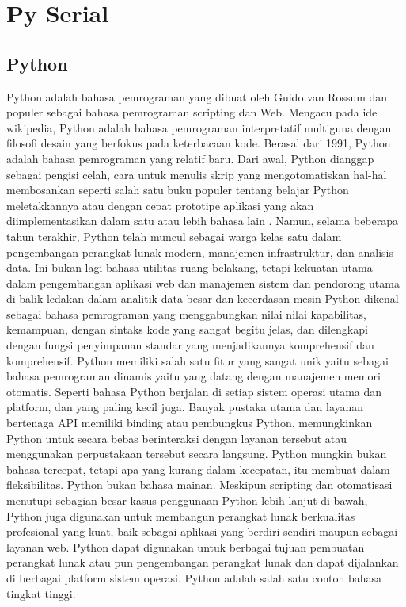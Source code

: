 \section{Py Serial}

	\subsection{Python}
	Python adalah bahasa pemrograman yang dibuat oleh Guido van Rossum dan populer sebagai bahasa pemrograman scripting dan Web. Mengacu pada ide wikipedia, Python adalah bahasa pemrograman interpretatif multiguna dengan filosofi desain yang berfokus pada keterbacaan kode. 
	Berasal dari 1991, Python adalah bahasa pemrograman yang relatif baru. Dari awal, Python dianggap sebagai pengisi celah, cara untuk menulis skrip yang mengotomatiskan hal-hal membosankan seperti salah satu buku populer tentang belajar Python meletakkannya atau dengan cepat prototipe aplikasi yang akan diimplementasikan dalam satu atau lebih bahasa lain .
	Namun, selama beberapa tahun terakhir, Python telah muncul sebagai warga kelas satu dalam pengembangan perangkat lunak modern, manajemen infrastruktur, dan analisis data. Ini bukan lagi bahasa utilitas ruang belakang, tetapi kekuatan utama dalam pengembangan aplikasi web dan manajemen sistem dan pendorong utama di balik ledakan dalam analitik data besar dan kecerdasan mesin
	Python dikenal sebagai bahasa pemrograman yang menggabungkan nilai nilai kapabilitas, kemampuan, dengan sintaks kode yang sangat begitu jelas, dan dilengkapi dengan fungsi penyimpanan standar yang menjadikannya komprehensif dan komprehensif. 
	Python memiliki salah satu fitur yang sangat unik yaitu sebagai bahasa pemrograman dinamis yaitu yang datang dengan manajemen memori otomatis. Seperti bahasa 
	Python berjalan di setiap sistem operasi utama dan platform, dan yang paling kecil juga. Banyak pustaka utama dan layanan bertenaga API memiliki binding atau pembungkus Python, memungkinkan Python untuk secara bebas berinteraksi dengan layanan tersebut atau menggunakan perpustakaan tersebut secara langsung. Python mungkin bukan bahasa tercepat, tetapi apa yang kurang dalam kecepatan, itu membuat dalam fleksibilitas.
	Python bukan bahasa mainan. Meskipun scripting dan otomatisasi menutupi sebagian besar kasus penggunaan Python lebih lanjut di bawah, Python juga digunakan untuk membangun perangkat lunak berkualitas profesional yang kuat, baik sebagai aplikasi yang berdiri sendiri maupun sebagai layanan web.
	Python dapat digunakan untuk berbagai tujuan pembuatan perangkat lunak atau pun pengembangan perangkat lunak dan dapat dijalankan di berbagai platform sistem operasi. Python adalah salah satu contoh bahasa tingkat tinggi. 
